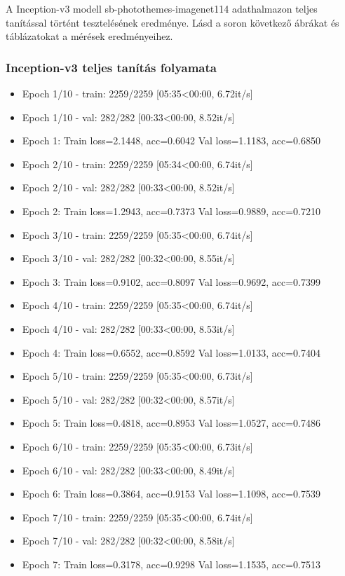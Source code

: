 A Inception-v3 modell sb-photothemes-imagenet114 adathalmazon teljes tanítással történt tesztelésének eredménye. Lásd a soron következő ábrákat és táblázatokat a mérések eredményeihez.

\subsubsection{Inception-v3 teljes tanítás folyamata}
\begin{itemize} 
	\item Epoch 1/10 - train: 2259/2259 [05:35<00:00,  6.72it/s]
	\item Epoch 1/10 - val: 282/282 [00:33<00:00,  8.52it/s]
	\item Epoch 1: Train loss=2.1448, acc=0.6042 Val loss=1.1183, acc=0.6850
	\item Epoch 2/10 - train: 2259/2259 [05:34<00:00,  6.74it/s]
	\item Epoch 2/10 - val: 282/282 [00:33<00:00,  8.52it/s]
	\item Epoch 2: Train loss=1.2943, acc=0.7373 Val loss=0.9889, acc=0.7210
	\item Epoch 3/10 - train: 2259/2259 [05:35<00:00,  6.74it/s]
	\item Epoch 3/10 - val: 282/282 [00:32<00:00,  8.55it/s]
	\item Epoch 3: Train loss=0.9102, acc=0.8097 Val loss=0.9692, acc=0.7399
	\item Epoch 4/10 - train: 2259/2259 [05:35<00:00,  6.74it/s]
	\item Epoch 4/10 - val: 282/282 [00:33<00:00,  8.53it/s]
	\item Epoch 4: Train loss=0.6552, acc=0.8592 Val loss=1.0133, acc=0.7404
	\item Epoch 5/10 - train: 2259/2259 [05:35<00:00,  6.73it/s]
	\item Epoch 5/10 - val: 282/282 [00:32<00:00,  8.57it/s]
	\item Epoch 5: Train loss=0.4818, acc=0.8953 Val loss=1.0527, acc=0.7486
	\item Epoch 6/10 - train: 2259/2259 [05:35<00:00,  6.73it/s]
	\item Epoch 6/10 - val: 282/282 [00:33<00:00,  8.49it/s]
	\item Epoch 6: Train loss=0.3864, acc=0.9153 Val loss=1.1098, acc=0.7539
	\item Epoch 7/10 - train: 2259/2259 [05:35<00:00,  6.74it/s]
	\item Epoch 7/10 - val: 282/282 [00:32<00:00,  8.58it/s]
	\item Epoch 7: Train loss=0.3178, acc=0.9298 Val loss=1.1535, acc=0.7513

\end{itemize}
